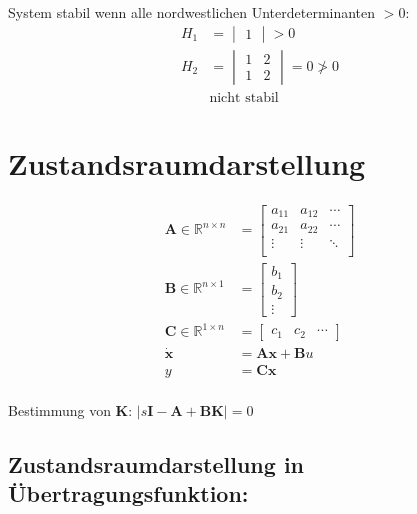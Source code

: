 \documentclass[11pt,a4paper,fleqn,headsepline]{scrreprt}
\begin{document}
\begin{multicols}{2}
        System stabil wenn alle nordwestlichen Unterdeterminanten \(>0\):
        \begin{align*}
            H_1 &= \begin{vmatrix} 1 \end{vmatrix} > 0 \\
            H_2 &= \begin{vmatrix} 1 & 2 \\ 1 & 2 \end{vmatrix} = 0 \ngtr 0 \\
            &\text{nicht stabil}
        \end{align*}

        \section*{Zustandsraumdarstellung}
        \begin{align*}
            \mathbf{A} \in \mathbb{R}^{n \times n} &= \begin{bmatrix}
                a_{11} & a_{12} & \cdots \\
                a_{21} & a_{22} & \cdots \\
                \vdots & \vdots & \ddots \\
            \end{bmatrix} \\
            \mathbf{B} \in \mathbb{R}^{n \times 1} &= \begin{bmatrix}
                b_1 \\ b_2 \\ \vdots
            \end{bmatrix} \\
            \mathbf{C} \in \mathbb{R}^{1 \times n} &= \begin{bmatrix}
                c_1 & c_2 & \cdots
            \end{bmatrix} \\
            \dot{\mathbf{x}} &= \mathbf{A} \mathbf{x} + \mathbf{B} u \\
            y &= \mathbf{C} \mathbf{x} \\
        \end{align*}

        Bestimmung von \(\mathbf{K}\): \(\left\lvert s\mathbf{I} - \mathbf{A} + \mathbf{B} \mathbf{K} \right\rvert = 0\)

        \subsection*{Zustandsraumdarstellung in Übertragungsfunktion:}


\end{multicols}
\end{document}

